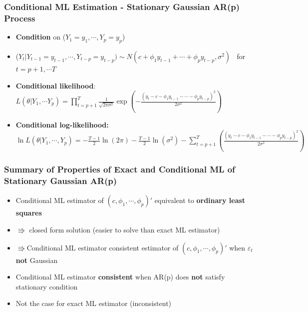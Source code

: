 \documentclass{beamer}
\begin{document}
	\begin{frame}
		\frametitle{Conditional ML Estimation - Stationary Gaussian AR(p) Process}
		\begin{itemize}
			
			\item[] \textbf{Condition} on ($Y_1=y_1,\cdots,Y_p=y_p$)
				\pause
			\vspace{25pt}
			\item[] ($Y_{t}|Y_{t-1}=y_{t-1},\cdots, Y_{t-p}=y_{t-p})\sim N(c+\phi_1y_{t-1}+\cdots+\phi_py_{t-p}, \sigma^2)\;\;$ for $t=p+1,\cdots T$
				\pause
			\vspace{25pt}
			
			
			\item[] \textbf{Conditional likelihood}:\\
			  $L(\theta|Y_1,\cdots Y_p)=\displaystyle \prod_{t=p+1}^{T} \frac{1}{\sqrt{2\pi\sigma^2}} \exp\left(-\frac{(y_t-c-\phi_1 y_{t-1}-\cdots-\phi_p y_{t-p})^2}{2\sigma^2}\right)$ 
				\pause
			\vspace{25pt}
			
			\item[]	\textbf{Conditional log-likelihood:}\\
$\ln L(\theta|Y_1,\cdots, Y_p)= - \frac{T-1}{2}\ln(2\pi) - \frac{T-1}{2}\ln(\sigma^2)-\sum_{t=p+1}^T \left(\frac{(y_t-c-\phi_1 y_{t-1}-\cdots -\phi_p y_{t-p})^2}{2\sigma^2}\right)$
			
				\end{itemize}
		\end{frame}
	
			
			
				\begin{frame}
				\frametitle{Summary of Properties of Exact and Conditional  ML  of Stationary Gaussian AR(p)}
				\begin{itemize}
		\item[] Conditional ML estimator of $(c,\phi_1,\cdots,\phi_p)'$ equivalent to \textbf{ordinary least squares}
		\pause
		\vspace{15pt}
		\item[] \hspace{25pt}$\Rrightarrow$ closed form solution (easier to solve than  exact ML estimator)	
			\pause
			\vspace{10pt}
		\item[]\hspace{25pt} $\Rrightarrow$Conditional ML estimator consistent estimator of $(c,\phi_1,\cdots,\phi_p)'$ when $\varepsilon_t$ \textbf{not} Gaussian 	
		\pause
		\vspace{25pt}
		\item[] Conditional ML estimator \textbf{consistent} when AR(p) does \textbf{not} satisfy stationary condition 
		\pause
		\vspace{15pt}
		\item[] \hspace{25pt} Not the case for exact ML estimator (inconsistent)
	
					
		\end{itemize}
		\end{frame}
	
\end{document}
